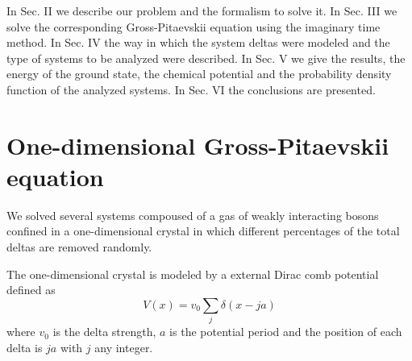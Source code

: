 \documentclass[twocolumn,showpacs,showkeys,preprintnumbers,superscriptaddress, pra, 10pt, aps]{revtex4-2}
\begin{document}
%

%
%
%
%

In Sec. II we describe our problem and the formalism to solve it. In Sec. III we solve the corresponding Gross-Pitaevskii equation using the imaginary time method. In Sec. IV the way in which the system deltas were modeled and the type of systems to be analyzed were described. In Sec. V we give the results, the energy of the ground state, the chemical potential and the probability density function of the analyzed systems. In Sec. VI the conclusions are presented.






\section{One-dimensional Gross-Pitaevskii equation}
We solved several systems compoused of a gas of weakly interacting bosons confined in a one-dimensional crystal in which different percentages of the total deltas are removed randomly.

The one-dimensional crystal is modeled by a external Dirac comb potential \cite{KP}  defined as
%
\begin{equation}
  \label{eq:dirac-comb-potential}
  V(x)=v_0 \sum_{j}\delta(x-ja)
\end{equation}
%
where $v_0$ is the delta strength, $a$ is the potential period and the position of each delta is
$ja$ with $j$ any integer.
\end{document}
